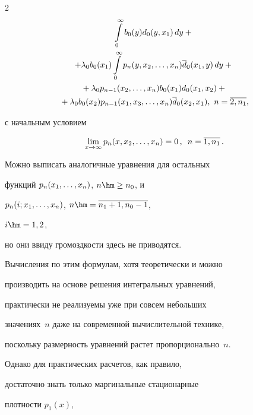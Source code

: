 \begin{multicols}{2}
\begin{multline*}
\int\limits_0^\infty b_0(y) d_0(y,x_1)\, dy


+{}


\\


+ \lambda_0 b_0(x_1)\int\limits_0^\infty p_n(y,x_2,\ld,x_n) \d_0(x_1,y)\, dy


+ {}\\


{}+\lambda_0 p_{n-1}(x_2,\ld,x_n) b_0(x_1) d_0(x_1,x_2) +{}


\\


{}+ \lambda_0 b_0(x_2) p_{n-1}(x_1,x_3,\ld,x_n) \d_0(x_2,x_1),


\ n=\overline{2,n_1},\hspace*{-0.52872pt}


\end{multline*}




с начальным условием




$$


\lim_{x\to\infty} p_n(x,x_2,\ld,x_n) = 0\,, \enskip n=\overline{1,n_1}\,.


$$




Можно выписать аналогичные уравнения для остальных


функций $p_n(x_1,\ldots,x_n)$, $n\hm\ge n_0$, и


$p_n(i;x_1,\ldots,x_n)$, $n\hm=\overline{n_1+1,n_0-1}$,


$i\hm=1,2$,


но они ввиду громоздкости здесь не приводятся.


Вычисления по этим формулам, хотя теоретически и можно


производить на основе решения интегральных уравнений,


практически не реализуемы уже при совсем небольших


значениях~$n$ даже на современной вычислительной технике,


поскольку размерность уравнений растет пропорционально~$n$.





Однако для практических расчетов, как правило,


достаточно знать только маргинальные стационарные


плотности $p_1(x)$,



\end{multicols}
